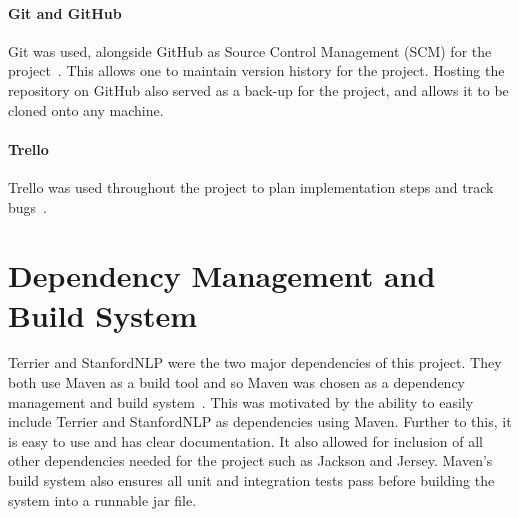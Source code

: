 \documentclass{l4proj}
\begin{document}
\paragraph{Git and GitHub}
Git was used, alongside GitHub as Source Control Management (SCM) for the project~\cite{git,github}. This allows one to maintain version history for the project. Hosting the repository on GitHub also served as a back-up for the project, and allows it to be cloned onto any machine.
\paragraph{Trello}
Trello was used throughout the project to plan implementation steps and track bugs~\cite{trello}.
\section{Dependency Management and Build System}
Terrier and StanfordNLP were the two major dependencies of this project. They both use Maven as a build tool and so Maven was chosen as a dependency management and build system~\cite{maven}. This was motivated by the ability to easily include Terrier and StanfordNLP as dependencies using Maven. Further to this, it is easy to use and has clear documentation. It also allowed for inclusion of all other dependencies needed for the project such as Jackson and Jersey. Maven's build system also ensures all unit and integration tests pass before building the system into a runnable jar file.
\end{document}
